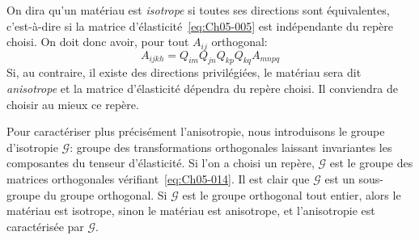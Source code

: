 On dira qu'un matériau est \emph{isotrope} si toutes ses directions sont équivalentes, c'est-à-dire si la matrice d'élasticité~\eqref{eq:Ch05-005} est indépendante du repère choisi.
On doit donc avoir, pour tout $A_{ij}$ orthogonal:
\begin{equation}
    A_{ijkh} = Q_{im} Q_{jn} Q_{kp} Q_{kq} A_{mnpq}
    \label{eq:Ch05-014}
\end{equation}
Si, au contraire, il existe des directions privilégiées, le matériau sera dit \emph{anisotrope} et la matrice d'élasticité dépendra du repère choisi.
Il conviendra de choisir au mieux ce repère.

Pour caractériser plus précisément l'anisotropie, nous introduisons le groupe d'isotropie $\mathcal{G}$: groupe des transformations orthogonales laissant invariantes les composantes du tenseur d'élasticité.
Si l'on a choisi un repère, $\mathcal{G}$ est le groupe des matrices orthogonales vérifiant~\eqref{eq:Ch05-014}.
Il est clair que $\mathcal{G}$ est un sous-groupe du groupe orthogonal.
Si $\mathcal{G}$ est le groupe orthogonal tout entier, alors le matériau est isotrope, sinon le matériau est anisotrope, et l'anisotropie est caractérisée par $\mathcal{G}$.

